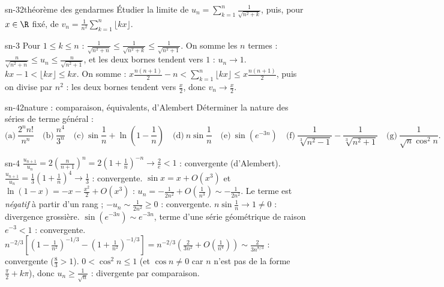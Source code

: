 \begin{exo}{sn-3}{2}{théorème des gendarmes}
Étudier la limite de $u_n=\sum_{k=1}^n\frac1{\sqrt{n^2+k}}$, puis, pour $x\in\R$ fixé, de $v_n=\frac1{n^2}\sum_{k=1}^n\lfloor kx\rfloor$.
\end{exo}

\begin{corrige}{sn-3}
 Pour $1\leq k\leq n$ : $\frac1{\sqrt{n^2+n}}\leq\frac1{\sqrt{n^2+k}}\leq\frac1{\sqrt{n^2+1}}$. On somme les $n$ termes :
$\frac n{\sqrt{n^2+n}}\leq u_n\leq\frac n{\sqrt{n^2+1}}$, et les deux bornes tendent vers $1$ : $u_n\to1$.
 $kx-1<\lfloor kx\rfloor\leq kx$. On somme : $x\frac{n(n+1)}2-n<\sum_{k=1}^n\lfloor kx\rfloor\leq x\frac{n(n+1)}2$, puis on divise par $n^2$ :
les deux bornes tendent vers $\frac x2$, donc $v_n\to\frac x2$.
\end{corrige}

\begin{exo}{sn-4}{2}{nature : comparaison, équivalents, d'Alembert}
Déterminer la nature des séries de terme général :
\[\text{(a)}\ \frac{2^nn!}{n^n}\quad\text{(b)}\ \frac{n^4}{3^n}\quad\text{(c)}\ \sin\frac1n+\ln\left(1-\frac1n\right)\quad\text{(d)}\ n\sin\frac1n\quad
\text{(e)}\ \sin(e^{-3n})\quad\text{(f)}\ \frac1{\sqrt[3]{n^2-1}}-\frac1{\sqrt[3]{n^2+1}}\quad\text{(g)}\ \frac1{\sqrt n\cos^2n}.\]
\end{exo}

\begin{corrige}{sn-4}
 $\frac{u_{n+1}}{u_n}=2\left(\frac n{n+1}\right)^n=2\left(1+\frac1n\right)^{-n}\to\frac2e<1$ : convergente (d'Alembert).
 $\frac{u_{n+1}}{u_n}=\frac13\left(1+\frac1n\right)^4\to\frac13$ : convergente.
 $\sin x=x+O(x^3)$ et $\ln(1-x)=-x-\frac{x^2}2+O(x^3)$ : $u_n=-\frac1{2n^2}+O\left(\frac1{n^3}\right)\sim-\frac1{2n^2}$. Le terme est
\emph{négatif} à partir d'un rang ; $-u_n\sim\frac1{2n^2}\geq0$ : convergente.
 $n\sin\frac1n\to1\neq0$ : divergence grossière.
 $\sin(e^{-3n})\sim e^{-3n}$, terme d'une série géométrique de raison $e^{-3}<1$ : convergente.
 $n^{-2/3}\left[\left(1-\frac1{n^2}\right)^{-1/3}-\left(1+\frac1{n^2}\right)^{-1/3}\right]=n^{-2/3}\left(\frac2{3n^2}+O\left(\frac1{n^4}\right)\right)\sim\frac2{3n^{8/3}}$ :
convergente ($\frac83>1$).
 $0<\cos^2n\leq1$ (et $\cos n\neq0$ car $n$ n'est pas de la forme $\frac\pi2+k\pi$), donc $u_n\geq\frac1{\sqrt n}$ : divergente par
comparaison.
\end{corrige}

